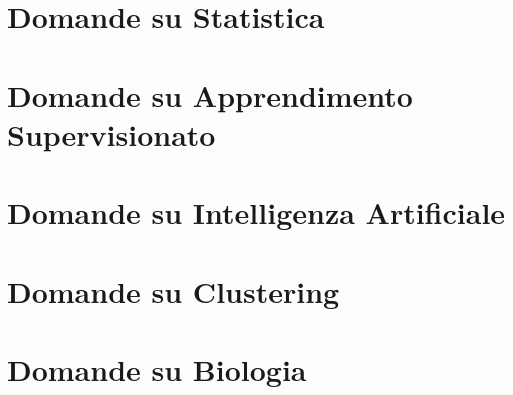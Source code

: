 \section{Domande su Statistica}


\section{Domande su Apprendimento Supervisionato}


\section{Domande su Intelligenza Artificiale}


\section{Domande su Clustering}


\section{Domande su Biologia}




